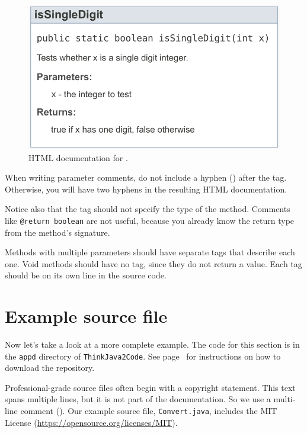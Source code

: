 \begin{figure}[!ht]
\begin{center}
\includegraphics[scale=0.8]{figs/javadoc.pdf}
\caption{HTML documentation for .}
\label{fig.javadoc}
\end{center}
\end{figure}

When writing parameter comments, do not include a hyphen (\java{-}) after the  tag.
Otherwise, you will have two hyphens in the resulting HTML documentation.

Notice also that the  tag should not specify the type of the method.
Comments like \textcolor{comment}{\tt @return boolean} are not useful, because you already know the return type from the method's signature.

Methods with multiple parameters should have separate  tags that describe each one.
Void methods should have no  tag, since they do not return a value.
Each tag should be on its own line in the source code.


\section{Example source file}

Now let's take a look at a more complete example.
The code for this section is in the {\tt appd} directory of {\tt ThinkJava2Code}.
See page~\pageref{code} for instructions on how to download the repository.

Professional-grade source files often begin with a copyright statement.
This text spans multiple lines, but it is not part of the documentation.
So we use a multi-line comment (\java{/*}).
Our example source file, {\tt Convert.java}, includes the MIT License (\url{https://opensource.org/licenses/MIT}).

